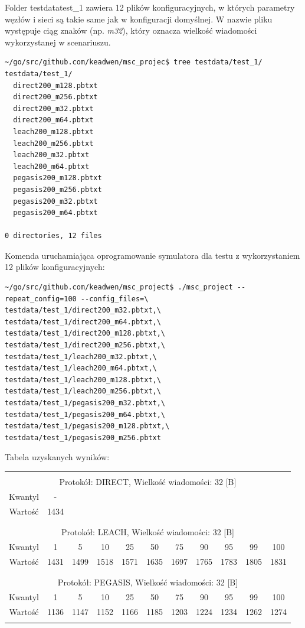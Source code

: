 \documentclass[a4paper,12pt,twoside,openany]{report}
\begin{document}
Folder testdata\/test\_1 zawiera 12 plików konfiguracyjnych, w których parametry węzłów i sieci są takie same jak w konfiguracji domyślnej.
W nazwie pliku występuje ciąg znaków (np. \textit{m32}), który oznacza wielkość wiadomości wykorzystanej w scenariuszu.

\begin{lstlisting}
~/go/src/github.com/keadwen/msc_projec$ tree testdata/test_1/
testdata/test_1/
  direct200_m128.pbtxt
  direct200_m256.pbtxt
  direct200_m32.pbtxt
  direct200_m64.pbtxt
  leach200_m128.pbtxt
  leach200_m256.pbtxt
  leach200_m32.pbtxt
  leach200_m64.pbtxt
  pegasis200_m128.pbtxt
  pegasis200_m256.pbtxt
  pegasis200_m32.pbtxt
  pegasis200_m64.pbtxt

0 directories, 12 files
\end{lstlisting}

Komenda uruchamiająca oprogramowanie symulatora dla testu z wykorzystaniem 12 plików konfiguracyjnych:

\begin{lstlisting}
~/go/src/github.com/keadwen/msc_project$ ./msc_project --repeat_config=100 --config_files=\
testdata/test_1/direct200_m32.pbtxt,\
testdata/test_1/direct200_m64.pbtxt,\
testdata/test_1/direct200_m128.pbtxt,\
testdata/test_1/direct200_m256.pbtxt,\
testdata/test_1/leach200_m32.pbtxt,\
testdata/test_1/leach200_m64.pbtxt,\
testdata/test_1/leach200_m128.pbtxt,\
testdata/test_1/leach200_m256.pbtxt,\
testdata/test_1/pegasis200_m32.pbtxt,\
testdata/test_1/pegasis200_m64.pbtxt,\
testdata/test_1/pegasis200_m128.pbtxt,\
testdata/test_1/pegasis200_m256.pbtxt
\end{lstlisting}

Tabela uzyskanych wyników:

\begin{longtable}{*{11}{c}}
\toprule \\*
\multicolumn{11}{c}{Protokół: DIRECT, Wielkość wiadomości: 32 [B]} \\*
Kwantyl	& -	\\*
Wartość	& 1434	\\*
\midrule \\*
\\*
\multicolumn{11}{c}{Protokół: LEACH, Wielkość wiadomości: 32 [B]} \\*
Kwantyl	& 1	& 5	& 10	& 25	& 50	& 75	& 90	& 95	& 99	& 100	\\*
Wartość	& 1431	& 1499	& 1518	& 1571	& 1635	& 1697	& 1765	& 1783	& 1805	& 1831	\\*
\midrule \\*
\\*
\multicolumn{11}{c}{Protokół: PEGASIS, Wielkość wiadomości: 32 [B]} \\*
Kwantyl	& 1	& 5	& 10	& 25	& 50	& 75	& 90	& 95	& 99	& 100	\\*
Wartość	& 1136	& 1147	& 1152	& 1166	& 1185	& 1203	& 1224	& 1234	& 1262	& 1274	\\*
\bottomrule \\*
\end{longtable}
\end{document}
